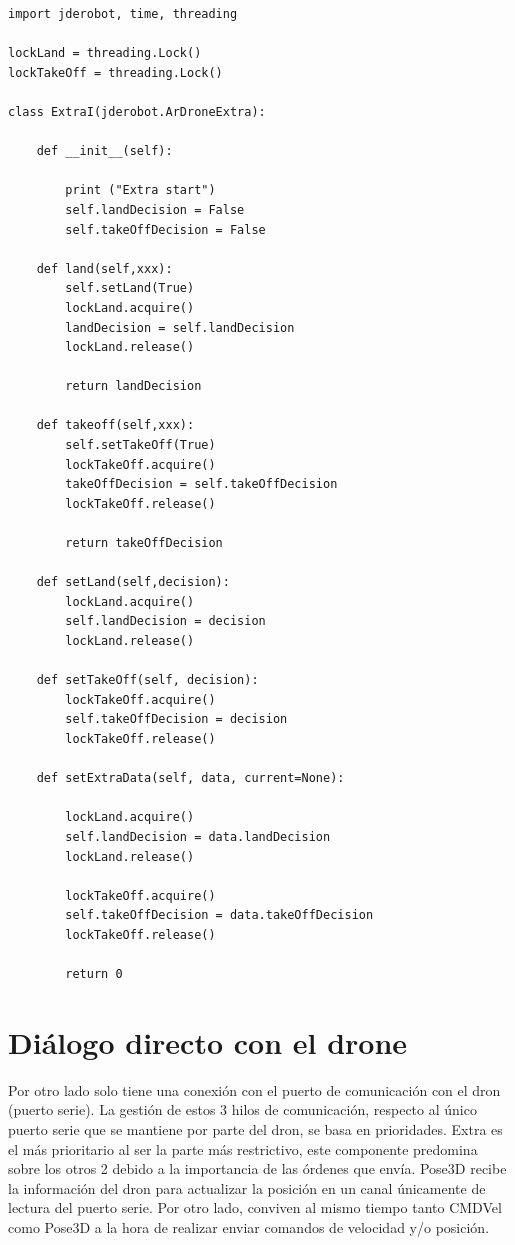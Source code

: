 \begin{lstlisting}[frame=single]
import jderobot, time, threading

lockLand = threading.Lock()
lockTakeOff = threading.Lock()

class ExtraI(jderobot.ArDroneExtra):

    def __init__(self):

        print ("Extra start")
        self.landDecision = False
        self.takeOffDecision = False

    def land(self,xxx):
        self.setLand(True)
        lockLand.acquire()
        landDecision = self.landDecision
        lockLand.release()

        return landDecision

    def takeoff(self,xxx):
        self.setTakeOff(True)
        lockTakeOff.acquire()
        takeOffDecision = self.takeOffDecision
        lockTakeOff.release()

        return takeOffDecision

    def setLand(self,decision):
        lockLand.acquire()
        self.landDecision = decision
        lockLand.release()

    def setTakeOff(self, decision):
        lockTakeOff.acquire()
        self.takeOffDecision = decision
        lockTakeOff.release()

    def setExtraData(self, data, current=None):

        lockLand.acquire()
        self.landDecision = data.landDecision
        lockLand.release()

        lockTakeOff.acquire()
        self.takeOffDecision = data.takeOffDecision
        lockTakeOff.release()

        return 0

\end{lstlisting}  

\section{Diálogo directo con el drone}

Por otro lado solo tiene una conexión con el puerto de comunicación con el dron (puerto serie). La gestión de estos 3 hilos de comunicación, respecto al único puerto serie que se mantiene por parte del dron, se basa en prioridades. Extra es el más prioritario al ser la parte más restrictivo, este componente predomina sobre los otros 2 debido a la importancia de las órdenes que envía. Pose3D recibe la información del dron para actualizar la posición en un canal únicamente de lectura del puerto serie. Por otro lado, conviven al mismo tiempo tanto CMDVel como Pose3D a la hora de realizar enviar comandos de velocidad y/o posición.

